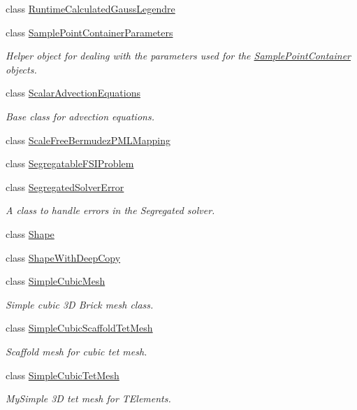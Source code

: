 \begin{DoxyCompactItemize}
class \hyperlink{classoomph_1_1RuntimeCalculatedGaussLegendre}{Runtime\+Calculated\+Gauss\+Legendre}
\item 
class \hyperlink{classoomph_1_1SamplePointContainerParameters}{Sample\+Point\+Container\+Parameters}
\begin{DoxyCompactList}\small\item\em Helper object for dealing with the parameters used for the \hyperlink{classSamplePointContainer}{Sample\+Point\+Container} objects. \end{DoxyCompactList}\item 
class \hyperlink{classoomph_1_1ScalarAdvectionEquations}{Scalar\+Advection\+Equations}
\begin{DoxyCompactList}\small\item\em Base class for advection equations. \end{DoxyCompactList}\item 
class \hyperlink{classoomph_1_1ScaleFreeBermudezPMLMapping}{Scale\+Free\+Bermudez\+P\+M\+L\+Mapping}
\item 
class \hyperlink{classoomph_1_1SegregatableFSIProblem}{Segregatable\+F\+S\+I\+Problem}
\item 
class \hyperlink{classoomph_1_1SegregatedSolverError}{Segregated\+Solver\+Error}
\begin{DoxyCompactList}\small\item\em A class to handle errors in the Segregated solver. \end{DoxyCompactList}\item 
class \hyperlink{classoomph_1_1Shape}{Shape}
\item 
class \hyperlink{classoomph_1_1ShapeWithDeepCopy}{Shape\+With\+Deep\+Copy}
\item 
class \hyperlink{classoomph_1_1SimpleCubicMesh}{Simple\+Cubic\+Mesh}
\begin{DoxyCompactList}\small\item\em Simple cubic 3D Brick mesh class. \end{DoxyCompactList}\item 
class \hyperlink{classoomph_1_1SimpleCubicScaffoldTetMesh}{Simple\+Cubic\+Scaffold\+Tet\+Mesh}
\begin{DoxyCompactList}\small\item\em Scaffold mesh for cubic tet mesh. \end{DoxyCompactList}\item 
class \hyperlink{classoomph_1_1SimpleCubicTetMesh}{Simple\+Cubic\+Tet\+Mesh}
\begin{DoxyCompactList}\small\item\em My\+Simple 3D tet mesh for T\+Elements. \end{DoxyCompactList}\item 

\end{DoxyCompactItemize}
